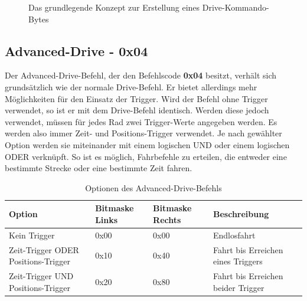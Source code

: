 \begin{figure}[h]
 \centering
 \caption{\label{prot_drive_concept}Das grundlegende Konzept zur Erstellung eines Drive-Kommando-Bytes}
\end{figure}

\subsection{Advanced-Drive - 0x04}
Der Advanced-Drive-Befehl, der den Befehlscode \textbf{0x04} besitzt, verhält sich grundsätzlich
wie der normale Drive-Befehl. Er bietet allerdings mehr Möglichkeiten für den Einsatz der Trigger.
Wird der Befehl ohne Trigger
verwendet, so ist er mit dem Drive-Befehl identisch. Werden diese jedoch verwendet,
müssen für jedes Rad zwei Trigger-Werte angegeben werden. Es werden also immer Zeit-
und Positions-Trigger verwendet. Je nach gewählter Option werden sie miteinander mit einem logischen
UND oder einem logischen ODER verknüpft. So ist es möglich, Fahrbefehle
zu erteilen, die entweder eine bestimmte Strecke oder eine bestimmte Zeit fahren.
\begin{table}[h]
\begin{center}
	\begin{tabularx}{\linewidth}{|X|l|l|X|}
		\hline
		\textbf{Option} & \textbf{Bitmaske Links} & \textbf{Bitmaske Rechts} & \textbf{Beschreibung} \\
		\hline
		\hline
		Kein Trigger				& 0x00						   & 0x00						   & Endlosfahrt \\
		\hline
		Zeit-Trigger ODER Positions-Trigger	& 0x10						   & 0x40						   & Fahrt bis Erreichen eines Triggers\\
		\hline
		Zeit-Trigger UND Positions-Trigger  & 0x20						   & 0x80						   & Fahrt bis Erreichen beider Trigger\\
		\hline
	\end{tabularx}
	\caption{\label{protocol_advanced_drive} Optionen des Advanced-Drive-Befehls}
\end{center}
\end{table}

